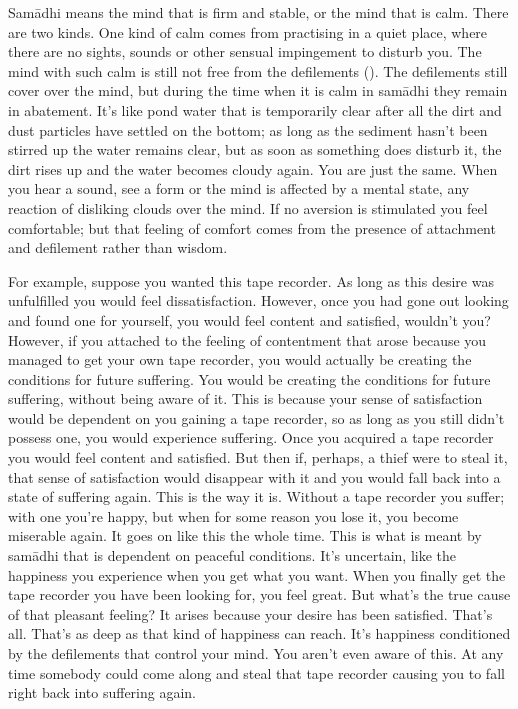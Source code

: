 Sam\=adhi means the mind that is firm and stable, or the mind that is calm. There are two kinds. One kind of calm comes from practising in a quiet place, where there are no sights, sounds or other sensual impingement to disturb you. The mind with such calm is still not free from the defilements (). The defilements still cover over the mind, but during the time when it is calm in sam\=adhi they remain in abatement. It's like pond water that is temporarily clear after all the dirt and dust particles have settled on the bottom; as long as the sediment hasn't been stirred up the water remains clear, but as soon as something does disturb it, the dirt rises up and the water becomes cloudy again. You are just the same. When you hear a sound, see a form or the mind is affected by a mental state, any reaction of disliking clouds over the mind. If no aversion is stimulated you feel comfortable; but that feeling of comfort comes from the presence of attachment and defilement rather than wisdom. 

For example, suppose you wanted this tape recorder. As long as this desire was unfulfilled you would feel dissatisfaction. However, once you had gone out looking and found one for yourself, you would feel content and satisfied, wouldn't you? However, if you attached to the feeling of contentment that arose because you managed to get your own tape recorder, you would actually be creating the conditions for future suffering. You would be creating the conditions for future suffering, without being aware of it. This is because your sense of satisfaction would be dependent on you gaining a tape recorder, so as long as you still didn't possess one, you would experience suffering. Once you acquired a tape recorder you would feel content and satisfied. But then if, perhaps, a thief were to steal it, that sense of satisfaction would disappear with it and you would fall back into a state of suffering again. This is the way it is. Without a tape recorder you suffer; with one you're happy, but when for some reason you lose it, you become miserable again. It goes on like this the whole time. This is what is meant by sam\=adhi that is dependent on peaceful conditions. It's uncertain, like the happiness you experience when you get what you want. When you finally get the tape recorder you have been looking for, you feel great. But what's the true cause of that pleasant feeling? It arises because your desire has been satisfied. That's all. That's as deep as that kind of happiness can reach. It's happiness conditioned by the defilements that control your mind. You aren't even aware of this. At any time somebody could come along and steal that tape recorder causing you to fall right back into suffering again. 

